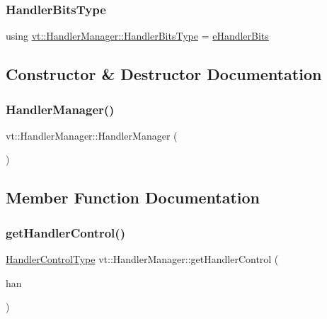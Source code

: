 \subsubsection{\texorpdfstring{Handler\+Bits\+Type}{HandlerBitsType}}
{\footnotesize\ttfamily using \hyperlink{namespacevt_af182285b57b225b163d5d8aff03cb8c2}{vt\+::\+Handler\+Manager\+::\+Handler\+Bits\+Type} =  \hyperlink{namespacevt_af182285b57b225b163d5d8aff03cb8c2}{e\+Handler\+Bits}}



\subsection{Constructor \& Destructor Documentation}
\mbox{\label{structvt_1_1_handler_manager_ab14c2718685b0ecd93d39b129c597ec9}} 
\subsubsection{\texorpdfstring{Handler\+Manager()}{HandlerManager()}}
{\footnotesize\ttfamily vt\+::\+Handler\+Manager\+::\+Handler\+Manager (\begin{DoxyParamCaption}{ }\end{DoxyParamCaption})\hspace{0.3cm}{\ttfamily [default]}}



\subsection{Member Function Documentation}
\mbox{\label{structvt_1_1_handler_manager_a90bf2b080d44af243e5a35bf8836d161}} 
\subsubsection{\texorpdfstring{get\+Handler\+Control()}{getHandlerControl()}}
{\footnotesize\ttfamily \hyperlink{namespacevt_adbbef13b92f0a93b14c219b7cc8a48f2}{Handler\+Control\+Type} vt\+::\+Handler\+Manager\+::get\+Handler\+Control (\begin{DoxyParamCaption}\item[{\hyperlink{namespacevt_af64846b57dfcaf104da3ef6967917573}{Handler\+Type}}]{han }\end{DoxyParamCaption})\hspace{0.3cm}{\ttfamily [static]}}

